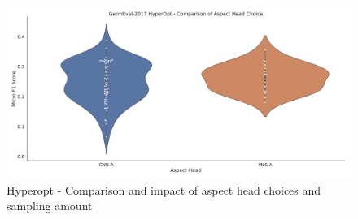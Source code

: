 \begin{figure}[ht]
	\centering
	\includegraphics[width=\textwidth]{figures/06_results/06_hp_ge_vio_aspectHead_test}
	\caption{Hyperopt - Comparison and impact of aspect head choices and sampling amount}
	\label{fig:06_ge_aspectHeadChoices}
\end{figure}
